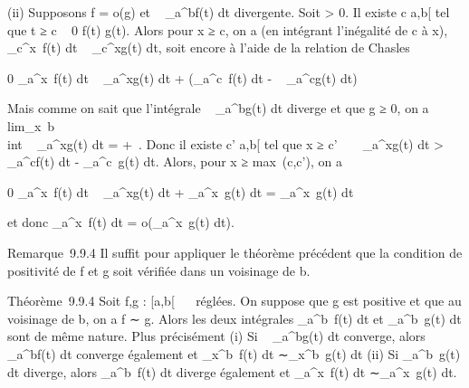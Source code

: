 \documentclass[]{article}
\begin{document}
(ii) Supposons f = o(g) et \int ~
\_a^bf(t) dt divergente. Soit \epsilon \textgreater{} 0. Il existe
c \in {[}a,b{[} tel que t ≥ c \rigtharrow~ 0 \leq f(t) \leq \epsilon {}
g(t). Alors pour x ≥ c, on a (en intégrant l'inégalité de c à x),
\int  \_c^x~f(t) dt \leq \epsilon
{} \int ~
\_c^xg(t) dt, soit encore à l'aide de la relation de
Chasles

0 \leq\int  \_a^x~f(t) dt \leq \epsilon
{} \int ~
\_a^xg(t) dt + \left
(\int  \_a^c~f(t) dt - \epsilon
{} \int ~
\_a^cg(t) dt\right )

Mais comme on sait que l'intégrale \int ~
\_a^bg(t) dt diverge et que g ≥ 0, on a
lim\_x\rightarrow~b\\int ~
\_a^xg(t) dt = +\infty~. Donc il existe c' \in {[}a,b{[} tel que x
≥ c' \rigtharrow~ \epsilon {} \int ~
\_a^xg(t) dt \textgreater{}\int ~
\_a^cf(t) dt - \epsilon {}
\int  \_a^c~g(t) dt. Alors, pour x
≥ max~(c,c'), on a

0 \leq\int  \_a^x~f(t) dt \leq \epsilon
{} \int ~
\_a^xg(t) dt + \epsilon {}
\int  \_a^x~g(t) dt =
\epsilon\int  \_a^x~g(t) dt

et donc \int  \_a^x~f(t) dt =
o(\int  \_a^x~g(t) dt).

Remarque~9.9.4 Il suffit pour appliquer le théorème précédent que la
condition de positivité de f et g soit vérifiée dans un voisinage de b.

Théorème~9.9.4 Soit f,g : {[}a,b{[}\rightarrow~ ~ réglées. On suppose que g est
positive et que au voisinage de b, on a f ∼ g. Alors les deux intégrales
\int  \_a^b~f(t) dt et
\int  \_a^b~g(t) dt sont de même
nature. Plus précisément (i) Si \int ~
\_a^bg(t) dt converge, alors \int ~
\_a^bf(t) dt converge également et
\int  \_x^b~f(t) dt
∼\int  \_x^b~g(t) dt (ii) Si
\int  \_a^b~g(t) dt diverge, alors
\int  \_a^b~f(t) dt diverge
également et \int  \_a^x~f(t) dt
∼\int  \_a^x~g(t) dt.
\end{document}
